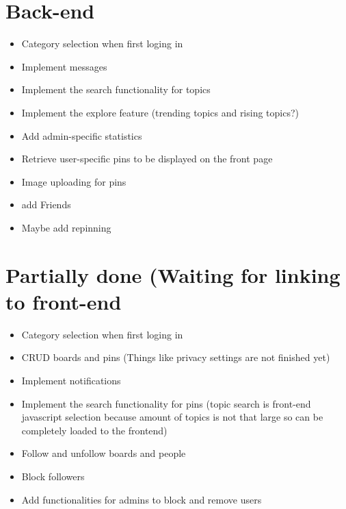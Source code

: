 \documentclass{article}
\begin{document}
\section{Back-end}
\begin{itemize}
\item Category selection when first loging in
\item Implement messages
\item Implement the search functionality for topics
\item Implement the explore feature (trending topics and rising topics?)
\item Add admin-specific statistics
\item Retrieve user-specific pins to be displayed on the front page
\item Image uploading for pins
\item add Friends
\item Maybe add repinning
\end{itemize}

\section{Partially done (Waiting for linking to front-end}
\begin{itemize}
\item Category selection when first loging in
\item CRUD boards and pins  (Things like privacy settings are not finished yet)
\item Implement notifications
\item Implement the search functionality for pins (topic search is front-end javascript selection because amount of topics is not that large so can be completely loaded to the frontend)
\item Follow and unfollow boards and people
\item Block followers
\item Add functionalities for admins to block and remove users
\end{itemize}
\end{document}
